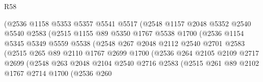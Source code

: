 \begin{lexlean}{R58}
\begin{coremodule}
                          (@2536
                            @1158
                            @5353
                            @5357
                            @5541
                            @5517
                            (@2548
                              @1157
                              @2048
                              @5352
                              @2540
                              @5540
                              @2583
                              (@2515
                                @1155
                                @89
                                @5350
                                @1767
                                @5538
                                @1700
                                (@2536
                                  @1154
                                  @5345
                                  @5349
                                  @5559
                                  @5538
                                  (@2548
                                    @267
                                    @2048
                                    @2112
                                    @2540
                                    @2701
                                    @2583
                                    (@2515
                                      @265
                                      @89
                                      @2110
                                      @1767
                                      @2699
                                      @1700
                                      (@2536
                                        @264
                                        @2105
                                        @2109
                                        @2717
                                        @2699
                                        (@2548
                                          @263
                                          @2048
                                          @2104
                                          @2540
                                          @2716
                                          @2583
                                          (@2515
                                            @261
                                            @89
                                            @2102
                                            @1767
                                            @2714
                                            @1700
                                            (@2536
                                              @260

\end{coremodule}
\end{lexlean}
